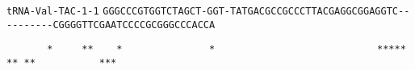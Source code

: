 \documentclass{article}
\newcommand{\rnabox}[1]{\colorbox{#1}{\texttt{#1}}}
\newcommand{\digitbox}[1]{\colorbox{-}{\texttt{#1}}}
\begin{document}
\vspace{-0.5mm}

\texttt{tRNA-Val-TAC-1-1}
\rnabox{G}\rnabox{G}\rnabox{G}\rnabox{C}\rnabox{C}\rnabox{C}\rnabox{G}\rnabox{T}\rnabox{G}\rnabox{G}\rnabox{T}\rnabox{C}\rnabox{T}\rnabox{A}\rnabox{G}\rnabox{C}\rnabox{T}\rnabox{-}\rnabox{G}\rnabox{G}\rnabox{T}\rnabox{-}\rnabox{T}\rnabox{A}\rnabox{T}\rnabox{G}\rnabox{A}\rnabox{C}\rnabox{G}\rnabox{C}\rnabox{C}\rnabox{G}\rnabox{C}\rnabox{C}\rnabox{C}\rnabox{T}\rnabox{T}\rnabox{A}\rnabox{C}\rnabox{G}\rnabox{A}\rnabox{G}\rnabox{G}\rnabox{C}\rnabox{G}\rnabox{G}\rnabox{A}\rnabox{G}\rnabox{G}\rnabox{T}\rnabox{C}\rnabox{-}\rnabox{-}\rnabox{-}\rnabox{-}\rnabox{-}\rnabox{-}\rnabox{-}\rnabox{-}\rnabox{-}\rnabox{-}\rnabox{C}\rnabox{G}\rnabox{G}\rnabox{G}\rnabox{G}\rnabox{T}\rnabox{T}\rnabox{C}\rnabox{G}\rnabox{A}\rnabox{A}\rnabox{T}\rnabox{C}\rnabox{C}\rnabox{C}\rnabox{C}\rnabox{G}\rnabox{C}\rnabox{G}\rnabox{G}\rnabox{G}\rnabox{C}\rnabox{C}\rnabox{C}\rnabox{A}\rnabox{C}\rnabox{C}\rnabox{A}

\vspace{-0.2mm}

\digitbox{ }\digitbox{ }\digitbox{ }\digitbox{ }\digitbox{ }\digitbox{ }\digitbox{ }\digitbox{*}\digitbox{ }\digitbox{ }\digitbox{ }\digitbox{ }\digitbox{ }\digitbox{*}\digitbox{*}\digitbox{ }\digitbox{ }\digitbox{ }\digitbox{ }\digitbox{*}\digitbox{ }\digitbox{ }\digitbox{ }\digitbox{ }\digitbox{ }\digitbox{ }\digitbox{ }\digitbox{ }\digitbox{ }\digitbox{ }\digitbox{ }\digitbox{ }\digitbox{ }\digitbox{ }\digitbox{ }\digitbox{*}\digitbox{ }\digitbox{ }\digitbox{ }\digitbox{ }\digitbox{ }\digitbox{ }\digitbox{ }\digitbox{ }\digitbox{ }\digitbox{ }\digitbox{ }\digitbox{ }\digitbox{ }\digitbox{ }\digitbox{ }\digitbox{ }\digitbox{ }\digitbox{ }\digitbox{ }\digitbox{ }\digitbox{ }\digitbox{ }\digitbox{ }\digitbox{ }\digitbox{ }\digitbox{ }\digitbox{ }\digitbox{ }\digitbox{*}\digitbox{*}\digitbox{*}\digitbox{*}\digitbox{*}\digitbox{ }\digitbox{*}\digitbox{*}\digitbox{ }\digitbox{*}\digitbox{*}\digitbox{ }\digitbox{ }\digitbox{ }\digitbox{ }\digitbox{ }\digitbox{ }\digitbox{ }\digitbox{ }\digitbox{ }\digitbox{ }\digitbox{ }\digitbox{*}\digitbox{*}\digitbox{*}
\end{document}
